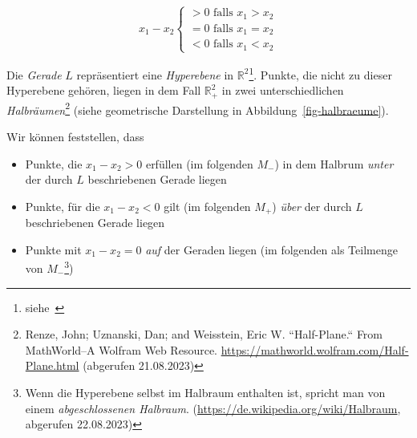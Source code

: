\begin{equation}
x_1 - x_2 \begin{cases}
               > 0 \text{ falls } x_1 > x_2 \\
               = 0 \text{ falls } x_1 = x_2 \\
               < 0 \text{ falls } x_1 < x_2
\end{cases}
\end{equation}

Die \textit{Gerade} $L$ repräsentiert eine \textit{Hyperebene} in $\mathbb{R}^2$\footnote{
    siehe~\cite[81, Definition 2.3]{BHW+12}
}.
Punkte, die nicht zu dieser Hyperebene gehören, liegen in dem Fall $\mathbb{R}_+^2$ in zwei unterschiedlichen \textit{Halbräumen}\footnote{
    Renze, John; Uznanski, Dan; and Weisstein, Eric W. ``Half-Plane.`` From MathWorld--A Wolfram Web Resource. \url{https://mathworld.wolfram.com/Half-Plane.html} (abgerufen 21.08.2023)
} (siehe geometrische Darstellung in Abbildung~\ref{fig-halbraeume}).

Wir können feststellen, dass


\begin{itemize}
    \item Punkte, die $x_1 - x_2 > 0$ erfüllen (im folgenden $M_-$) in dem Halbrum \textit{unter} der durch $L$ beschriebenen Gerade liegen
    \item Punkte, für die  $x_1 - x_2 < 0$ gilt (im folgenden $M_+$) \textit{über} der durch $L$ beschriebenen Gerade liegen
    \item Punkte mit $x_1 - x_2 = 0$ \textit{auf} der Geraden liegen (im folgenden als Teilmenge von $M_-$\footnote{
        Wenn die Hyperebene selbst im Halbraum enthalten ist, spricht man von einem \textit{abgeschlossenen Halbraum}. (\url{https://de.wikipedia.org/wiki/Halbraum}, abgerufen 22.08.2023)
    })
\end{itemize}


